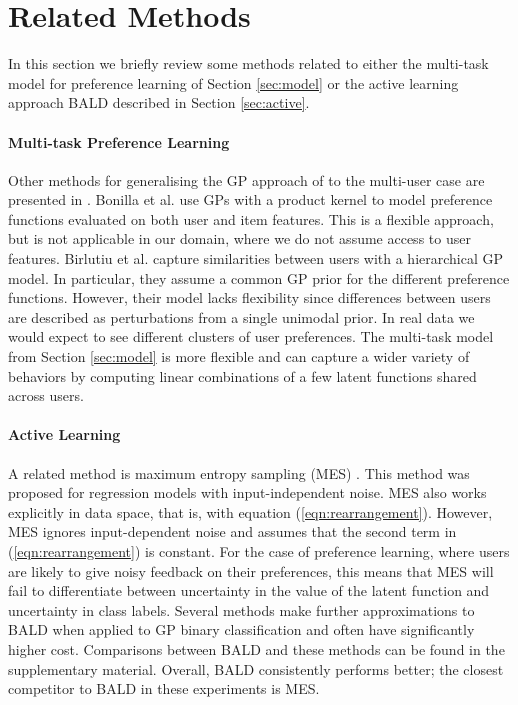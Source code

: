 \section{Related Methods \label{sec:relatedWork}}

In this section we briefly review some methods related to either the multi-task model for preference learning
of Section \ref{sec:model} or the active learning approach BALD described in Section \ref{sec:active}.

\paragraph{Multi-task Preference Learning} Other methods for generalising the GP approach of \cite{chu2005} to
the multi-user case are presented in \cite{Bonilla2010,birlutiu2009}. 
Bonilla et al. use GPs with a product kernel to model preference functions evaluated on both user and item features.
This is a flexible approach, but is not applicable in our domain, where we do not assume access to user features.
Birlutiu et al. capture similarities between users with a hierarchical GP model. 
In particular, they assume a common GP prior for the different preference functions.
However, their model lacks flexibility since differences between users are described
as perturbations from a single unimodal prior. In real data we would expect
to see different clusters of user preferences. The multi-task model from Section \ref{sec:model} is more flexible and can
capture a wider variety of behaviors by computing linear combinations of a few latent functions shared across users.

\paragraph{Active Learning} A related method is maximum entropy sampling (MES) \cite{sebastiani2000}. 
This method was proposed for regression models with input-independent noise. 
MES also works explicitly in data space, that is, with equation (\ref{eqn:rearrangement}). 
However, MES ignores input-dependent noise
and assumes that the second term in (\ref{eqn:rearrangement}) is constant. For the case of preference learning,
where users are likely to give noisy feedback on their preferences,
this means that MES will fail to differentiate between uncertainty in the value of the latent function
and uncertainty in class labels.
Several methods make further approximations to BALD when applied to GP
binary classification and often have significantly higher cost. Comparisons between BALD
and these methods can be found in the supplementary material. Overall, BALD consistently performs better;
the closest competitor to BALD in these experiments is MES.
